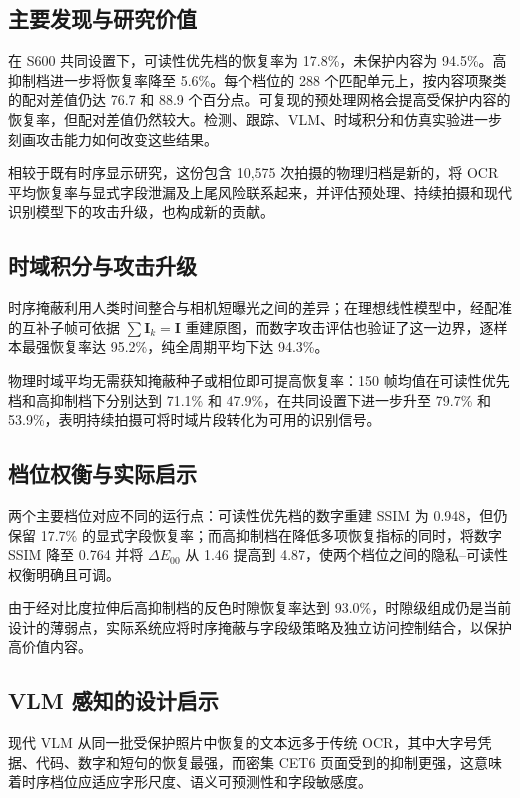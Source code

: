\documentclass{ieeeaccess}
\begin{document}
\subsection{主要发现与研究价值}

在 S600 共同设置下，可读性优先档的恢复率为 17.8\%，未保护内容为 94.5\%。高抑制档进一步将恢复率降至 5.6\%。每个档位的 288 个匹配单元上，按内容项聚类的配对差值仍达 76.7 和 88.9 个百分点。可复现的预处理网格会提高受保护内容的恢复率，但配对差值仍然较大。检测、跟踪、VLM、时域积分和仿真实验进一步刻画攻击能力如何改变这些结果。

相较于既有时序显示研究，这份包含 10,575 次拍摄的物理归档是新的，将 OCR 平均恢复率与显式字段泄漏及上尾风险联系起来，并评估预处理、持续拍摄和现代识别模型下的攻击升级，也构成新的贡献。

\subsection{时域积分与攻击升级}

时序掩蔽利用人类时间整合与相机短曝光之间的差异；在理想线性模型中，经配准的互补子帧可依据 $\sum\mathbf{I}_k = \mathbf{I}$ 重建原图，而数字攻击评估也验证了这一边界，逐样本最强恢复率达 95.2\%，纯全周期平均下达 94.3\%。

物理时域平均无需获知掩蔽种子或相位即可提高恢复率：150 帧均值在可读性优先档和高抑制档下分别达到 71.1\% 和 47.9\%，在共同设置下进一步升至 79.7\% 和 53.9\%，表明持续拍摄可将时域片段转化为可用的识别信号。

\subsection{档位权衡与实际启示}

两个主要档位对应不同的运行点：可读性优先档的数字重建 SSIM 为 0.948，但仍保留 17.7\% 的显式字段恢复率；而高抑制档在降低多项恢复指标的同时，将数字 SSIM 降至 0.764 并将 $\Delta E_{00}$ 从 1.46 提高到 4.87，使两个档位之间的隐私--可读性权衡明确且可调。

由于经对比度拉伸后高抑制档的反色时隙恢复率达到 93.0\%，时隙级组成仍是当前设计的薄弱点，实际系统应将时序掩蔽与字段级策略及独立访问控制结合，以保护高价值内容。

\subsection{VLM 感知的设计启示}
\label{sec:vlm_defense}

现代 VLM 从同一批受保护照片中恢复的文本远多于传统 OCR，其中大字号凭据、代码、数字和短句的恢复最强，而密集 CET6 页面受到的抑制更强，这意味着时序档位应适应字形尺度、语义可预测性和字段敏感度。
\end{document}
